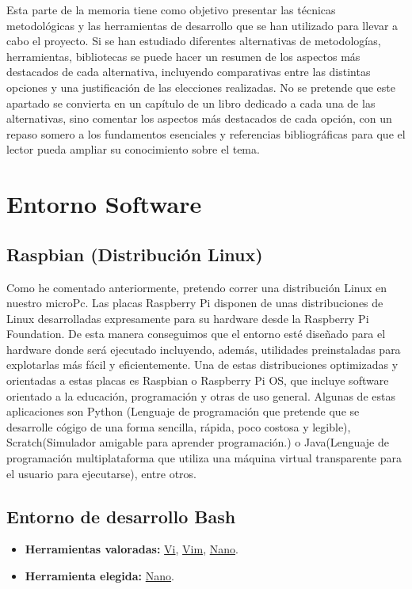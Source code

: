 
Esta parte de la memoria tiene como objetivo presentar las técnicas metodológicas y las herramientas de desarrollo que se han utilizado para llevar a cabo el proyecto. Si se han estudiado diferentes alternativas de metodologías, herramientas, bibliotecas se puede hacer un resumen de los aspectos más destacados de cada alternativa, incluyendo comparativas entre las distintas opciones y una justificación de las elecciones realizadas. 
No se pretende que este apartado se convierta en un capítulo de un libro dedicado a cada una de las alternativas, sino comentar los aspectos más destacados de cada opción, con un repaso somero a los fundamentos esenciales y referencias bibliográficas para que el lector pueda ampliar su conocimiento sobre el tema.


\section{Entorno Software}
\subsection{Raspbian (Distribución Linux)}
Como he comentado anteriormente, pretendo correr una distribución Linux en nuestro microPc. Las placas Raspberry Pi disponen de unas distribuciones de Linux desarrolladas expresamente para su hardware desde la Raspberry Pi Foundation. De esta manera conseguimos que el entorno esté diseñado para el hardware donde será ejecutado incluyendo, además, utilidades preinstaladas para explotarlas más fácil y eficientemente. Una de estas distribuciones optimizadas y orientadas a estas placas es Raspbian\cite{misc:RbPWeb} o Raspberry Pi OS, que incluye software orientado a la educación, programación y otras de uso general. Algunas de estas aplicaciones son Python\cite{misc:Python} (Lenguaje de programación que pretende que se desarrolle cógigo de una forma sencilla, rápida, poco costosa y legible), Scratch\cite{misc:Scratch}(Simulador amigable para aprender programación.) o Java\cite{misc:Java}(Lenguaje de programación multiplataforma que utiliza una máquina virtual transparente para el usuario para ejecutarse), entre otros.

\subsection{Entorno de desarrollo Bash}
\begin{itemize}
    \item \textbf{Herramientas valoradas:} \href{https://www.freebsd.org/cgi/man.cgi?query=vi&sektion=1}{Vi}, \href{https://www.vim.org/}{Vim}, \href{https://www.nano-editor.org/}{Nano}.
    \item \textbf{Herramienta elegida:} \href{https://www.nano-editor.org/}{Nano}.
\end{itemize}

